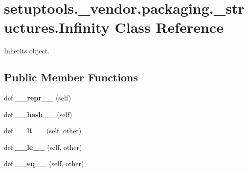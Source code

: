 \hypertarget{classsetuptools_1_1__vendor_1_1packaging_1_1__structures_1_1_infinity}{}\section{setuptools.\+\_\+vendor.\+packaging.\+\_\+structures.\+Infinity Class Reference}
\label{classsetuptools_1_1__vendor_1_1packaging_1_1__structures_1_1_infinity}


Inherits object.

\subsection*{Public Member Functions}
\begin{DoxyCompactItemize}
\item 
\mbox{\label{classsetuptools_1_1__vendor_1_1packaging_1_1__structures_1_1_infinity_ab6388264a8fb9db2554cf64dbcbee9cd}} 
def {\bfseries \+\_\+\+\_\+repr\+\_\+\+\_\+} (self)
\item 
\mbox{\label{classsetuptools_1_1__vendor_1_1packaging_1_1__structures_1_1_infinity_a9f1758324148aa4a20c6fd3160c920f8}} 
def {\bfseries \+\_\+\+\_\+hash\+\_\+\+\_\+} (self)
\item 
\mbox{\label{classsetuptools_1_1__vendor_1_1packaging_1_1__structures_1_1_infinity_a937df3bcd86e192fd08e3d83ec53c323}} 
def {\bfseries \+\_\+\+\_\+lt\+\_\+\+\_\+} (self, other)
\item 
\mbox{\label{classsetuptools_1_1__vendor_1_1packaging_1_1__structures_1_1_infinity_a4cdee8028e991e6a34cc0036c2ced802}} 
def {\bfseries \+\_\+\+\_\+le\+\_\+\+\_\+} (self, other)
\item 
\mbox{\label{classsetuptools_1_1__vendor_1_1packaging_1_1__structures_1_1_infinity_a926105102298231e868d7a06e8211f59}} 
def {\bfseries \+\_\+\+\_\+eq\+\_\+\+\_\+} (self, other)

\end{DoxyCompactItemize}
